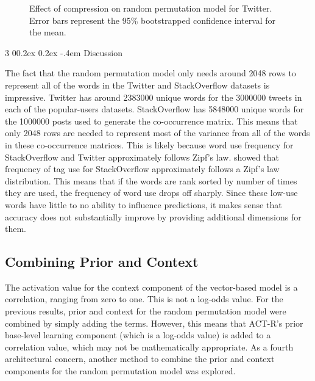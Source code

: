 \documentclass[man,floatsintext,donotrepeattitle]{apa6}
\makeatletter
\renewcommand{\subsubsection}{%
  \@startsection
  {subsubsection}%
  {3}%
  {\parindent}%
  {0\baselineskip \@plus 0.2ex \@minus 0.2ex}%
  {-.4em}%
  {\normalfont\normalsize\bfseries\addperi}}
\makeatother
\begin{document}
\begin{figure}[!htbp]
  \caption{
    Effect of compression on random permutation model for Twitter.
    Error bars represent the 95\% bootstrapped confidence interval for the mean.
  }
  \label{figContextDimT}
\end{figure}

\subsubsection{Discussion}

The fact that the random permutation model only needs around \num{2048} rows to represent all of the words in the Twitter and StackOverflow datasets is impressive.
Twitter has around \num{2383000} unique words for the \num{3000000} tweets in each of the popular-users datasets.
StackOverflow has \num{5848000} unique words for the \num{1000000} posts used to generate the co-occurrence matrix.
This means that only \num{2048} rows are needed to represent most of the variance from all of the words in these co-occurrence matrices.
This is likely because word use frequency for StackOverflow and Twitter approximately follows Zipf's law.
\textcite{Stanley2013} showed that frequency of tag use for StackOverflow approximately follows a Zipf's law distribution.
This means that if the words are rank sorted by number of times they are used, the frequency of word use drops off sharply.
Since these low-use words have little to no ability to influence predictions, it makes sense that accuracy does not substantially improve by providing additional dimensions for them.

\subsection{Combining Prior and Context}

The activation value for the context component of the vector-based model is a correlation, ranging from zero to one.
This is not a log-odds value.
For the previous results, prior and context for the random permutation model were combined by simply adding the terms.
However, this means that ACT-R's prior base-level learning component (which is a log-odds value) is added to a correlation value, which may not be mathematically appropriate.
As a fourth architectural concern, another method to combine the prior and context components for the random permutation model was explored.
\end{document}
